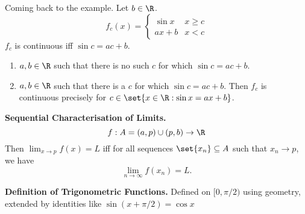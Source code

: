 Coming back to the example. Let $b \in \R$. \[
    f_{c}(x) = \begin{cases}
        \sin x & x \geq c \\
        ax + b & x < c
    \end{cases}
\] $f_{c}$ is continuous iff $\sin c = ac + b$.
\begin{enumerate}[label=(Case \arabic*)]
    \item $a, b \in \R$ such that there is no such $c$ for which $\sin c = ac + b$.
    \item $a, b \in \R$ such that there is a $c$ for which $\sin c = ac + b$. Then $f_{c}$ is continuous precisely for $c \in \set{x \in \R: \sin x = ax + b}$.
\end{enumerate}

\textbf{Sequential Characterisation of Limits.}
\[
    f : A = (a, p) \cup (p, b) \to \R
\] Then $\lim_{x \to p} f(x) = L$ iff for all sequences $\set{x_{n}} \subseteq A$ such that $x_{n} \to p$, we have \[
    \lim_{n \to \infty} f(x_{n}) = L.
\]

\textbf{Definition of Trigonometric Functions.}
Defined on $[0, \pi/2)$ using geometry, extended by identities like $\sin(x + \pi/2) = \cos x$




